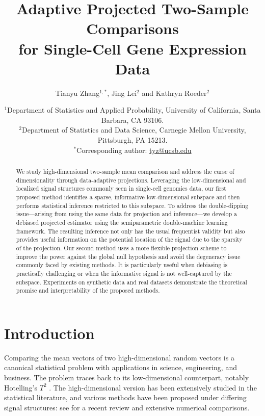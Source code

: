 \documentclass[11pt]{article}
\begin{document}
\title{Adaptive Projected Two-Sample Comparisons \\for Single-Cell Gene Expression Data
}

\author{
  Tianyu Zhang$^{1,*}$,
  Jing Lei$^{2}$ and 
  Kathryn Roeder$^{2}$
}

\date{
  {\small
  $^{1}$Department of Statistics and Applied Probability, University of California, Santa Barbara, CA 93106.\\
  $^{2}$Department of Statistics and Data Science, Carnegie Mellon University, Pittsburgh, PA 15213.\\
  $^{*}$Corresponding author: \url{tyz@ucsb.edu}\\
  }
}

\maketitle
\begin{abstract}
We study high-dimensional two-sample mean comparison and address the curse of dimensionality through data-adaptive projections. Leveraging the low-dimensional and localized signal structures commonly seen in single-cell genomics data, our first proposed method identifies a sparse, informative low-dimensional subspace and then performs statistical inference restricted to this subspace. To address the double-dipping issue---arising from using the same data for projection and inference---we develop a debiased projected estimator using the semiparametric double-machine learning framework. The resulting inference not only has the usual frequentist validity but also provides useful information on the potential location of the signal due to the sparsity of the projection. Our second method uses a more flexible projection scheme to improve the power against the global null hypothesis and avoid the degeneracy issue commonly faced by existing methods. It is particularly useful when debiasing is practically challenging or when the informative signal is not well-captured by the subspace. Experiments on synthetic data and real datasets demonstrate the theoretical promise and interpretability of the proposed methods.  
\end{abstract}

\tableofcontents

\section{Introduction}\label{section: intro}

Comparing the mean vectors of two high-dimensional random vectors is a canonical statistical problem with applications in science, engineering, and business. The problem traces back to its low-dimensional counterpart, notably Hotelling's $T^2$ \citep{hotellings}. The high-dimensional version has been extensively studied in the statistical literature, and various methods have been proposed under differing signal structures: see \cite{huang2022overview} for a recent review and extensive numerical comparisons.
\end{document}

